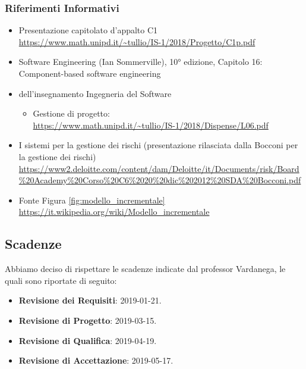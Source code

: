 		\subsubsection{Riferimenti Informativi}\label{rifinfo}
			\begin{itemize}
				\item Presentazione capitolato d'appalto C1\\
				\url{https://www.math.unipd.it/~tullio/IS-1/2018/Progetto/C1p.pdf}
				\item Software Engineering (Ian Sommerville), 10° edizione, Capitolo 16: Component-based software engineering
				\item {} dell’insegnamento Ingegneria del Software
				\begin{itemize}
					\item Gestione di progetto:\\
					\url{https://www.math.unipd.it/~tullio/IS-1/2018/Dispense/L06.pdf} 
				\end{itemize}
				\item I sistemi per la gestione dei rischi (presentazione rilasciata dalla Bocconi per la gestione dei rischi)\\
				\url{https://www2.deloitte.com/content/dam/Deloitte/it/Documents/risk/Board\%20Academy\%20Corso\%20C6\%2020\%20dic\%202012\%20SDA\%20Bocconi.pdf}
				\item Fonte Figura \ref{fig:modello_incrementale}\\
				\url{https://it.wikipedia.org/wiki/Modello_incrementale}
			\end{itemize}
		
	\subsection{Scadenze}\label{Scadenze}
	Abbiamo deciso di rispettare le scadenze indicate dal professor Vardanega, le quali sono riportate di seguito:
	\begin{itemize}
		\item \textbf{Revisione dei Requisiti}: 2019-01-21.
		\item \textbf{Revisione di Progetto}: 2019-03-15.
		\item \textbf{Revisione di Qualifica}: 2019-04-19.
		\item \textbf{Revisione di Accettazione}: 2019-05-17.
	\end{itemize}
	
